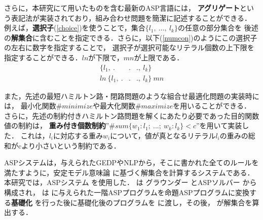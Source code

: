 さらに，本研究にて用いたものを含む最新のASP言語には，
\textbf{アグリゲート}という表記法が実装されており，組み合わせ問題を簡潔に記述することができる．
例えば，\textbf{選択子}(\ref{choice})を使うことで，集合$\{l_1, ~..., ~l_k\}$の任意の部分集合を
後述の\textbf{解集合}に含むことを指定できる．さらに，以下(\ref{numcon})のようにこの選択子の左右に数字を指定することで，
選択子が選択可能なリテラル個数の上下限を指定することができる．$ln$が下限で，$mn$が上限である．
\begin{eqnarray}
  \label{choice}
  \{l_1, ~.&.&., ~l_k\} \\
  \label{numcon}
  ln ~\{l_1, ~.&.&., ~l_k\} ~mn
\end{eqnarray}

また，先述の最短ハミルトン路・閉路問題のような組合せ最適化問題の実装時には，
最小化関数$\#minimize$や最大化関数$\#maximize$を用いることができる．
さらに，先述の制約付きハミルトン路問題を解くにあたり必要であった目的関数値の制約は，
\textbf{重み付き個数制約}”$\#sum\{w_1:l_1; ~...;~w_k:l_k\} < c$”を用いて実装した．
これは，$l_i$に対応する重み$w_i$について，値が真となるリテラル$l_i$の重みの総和がcより小さいという制約である．

ASPシステムは，与えられたGEDPやNLPから，そこに書かれた全てのルールを満たすように，安定モデル意味論
\cite{%
  Inoue08,%
  Gelfond88%
}
に基づく解集合を計算するシステムである．本研究では，ASPシステム \clingo を使用した．
 \clingo は グラウンダー \gringo とASPソルバー \clasp から構成され，
 \gringo は \clingo に与えられた一階ASPプログラムを命題ASPプログラムに変換する\textbf{基礎化}
を行った後に基礎化後のプログラムを \clasp に渡し，その後， \clasp が解集合を算出する．
\newpage

